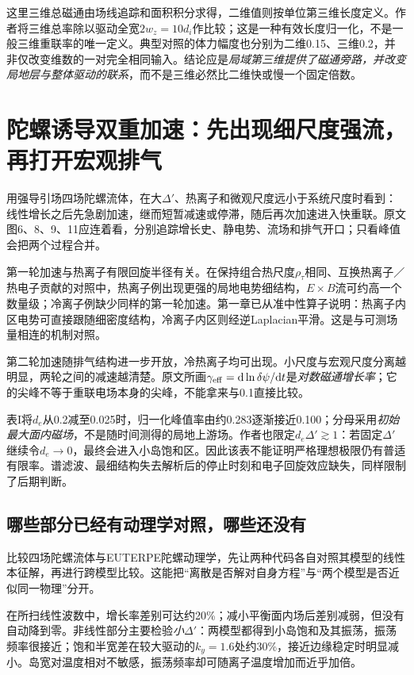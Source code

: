 这里三维总磁通由场线追踪和面积积分求得，二维值则按单位第三维长度定义。作者将三维总率除以驱动全宽$2w_z=10d_i$作比较；这是一种有效长度归一化，不是一般三维重联率的唯一定义。典型对照的体力幅度也分别为二维0.15、三维0.2，并非仅改变维数的一对完全相同输入。结论应是\emph{局域第三维提供了磁通旁路，并改变局地层与整体驱动的联系}，而不是三维必然比二维快或慢一个固定倍数。

\section{陀螺诱导双重加速：先出现细尺度强流，再打开宏观排气}
\citet{F672}用强导引场四场陀螺流体，在大$\Delta'$、热离子和微观尺度远小于系统尺度时看到：线性增长之后先急剧加速，继而短暂减速或停滞，随后再次加速进入快重联。原文图6、8、9、11应连着看，分别追踪增长史、静电势、流场和排气开口；只看峰值会把两个过程合并。

第一轮加速与热离子有限回旋半径有关。在保持组合热尺度$\rho_\tau$相同、互换热离子／热电子贡献的对照中，热离子例出现更强的局地电势细结构，$E\times B$流可约高一个数量级；冷离子例缺少同样的第一轮加速。第一章已从准中性算子说明：热离子内区电势可直接跟随细密度结构，冷离子内区则经逆Laplacian平滑。这是与可测场量相连的机制对照。

第二轮加速随排气结构进一步开放，冷热离子均可出现。小尺度与宏观尺度分离越明显，两轮之间的减速越清楚。原文所画$\gamma_{\rm eff}=\mathrm d\ln\delta\psi/\mathrm d t$是\emph{对数磁通增长率}；它的尖峰不等于重联电场本身的尖峰，不能拿来与0.1直接比较。

表I将$d_e$从0.2减至0.025时，归一化峰值率由约0.283逐渐接近0.100；分母采用\emph{初始最大面内磁场}，不是随时间测得的局地上游场。作者也限定$d_e\Delta'\gtrsim1$：若固定$\Delta'$继续令$d_e\to0$，最终会进入小岛饱和区。因此该表不能证明严格理想极限仍有普适有限率。谱滤波、最细结构失去解析后的停止时刻和电子回旋效应缺失，同样限制了后期判断。

\subsection{哪些部分已经有动理学对照，哪些还没有}
\citet{E475}比较四场陀螺流体与EUTERPE陀螺动理学，先让两种代码各自对照其模型的线性本征解，再进行跨模型比较。这能把“离散是否解对自身方程”与“两个模型是否近似同一物理”分开。

在所扫线性波数中，增长率差别可达约20\%；减小平衡面内场后差别减弱，但没有自动降到零。非线性部分主要检验\emph{小}$\Delta'$：两模型都得到小岛饱和及其振荡，振荡频率很接近；饱和半宽差在较大驱动的$k_y=1.6$处约30\%，接近边缘稳定时明显减小。岛宽对温度相对不敏感，振荡频率却可随离子温度增加而近乎加倍。

